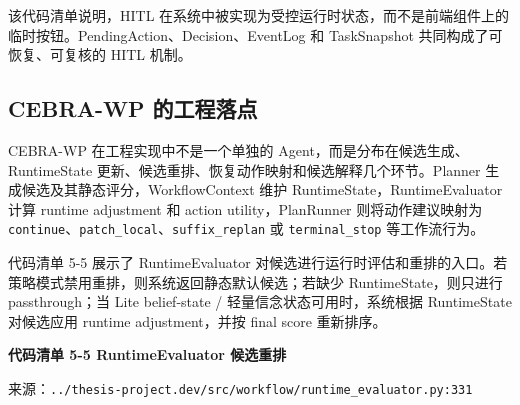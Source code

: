 该代码清单说明，HITL
在系统中被实现为受控运行时状态，而不是前端组件上的临时按钮。PendingAction、Decision、EventLog
和 TaskSnapshot 共同构成了可恢复、可复核的 HITL 机制。

\subsection{CEBRA-WP
的工程落点}\label{cebra-wp-ux7684ux5de5ux7a0bux843dux70b9}

CEBRA-WP 在工程实现中不是一个单独的
Agent，而是分布在候选生成、RuntimeState
更新、候选重排、恢复动作映射和候选解释几个环节。Planner
生成候选及其静态评分，WorkflowContext 维护
RuntimeState，RuntimeEvaluator 计算 runtime adjustment 和 action
utility，PlanRunner 则将动作建议映射为
\texttt{continue}、\texttt{patch\_local}、\texttt{suffix\_replan} 或
\texttt{terminal\_stop} 等工作流行为。

代码清单 5-5 展示了 RuntimeEvaluator
对候选进行运行时评估和重排的入口。若策略模式禁用重排，则系统返回静态默认候选；若缺少
RuntimeState，则只进行 passthrough；当 Lite belief-state /
轻量信念状态可用时，系统根据 RuntimeState 对候选应用 runtime
adjustment，并按 final score 重新排序。

\textbf{代码清单 5-5 RuntimeEvaluator 候选重排}

来源：\texttt{../thesis-project.dev/src/workflow/runtime\_evaluator.py:331}

